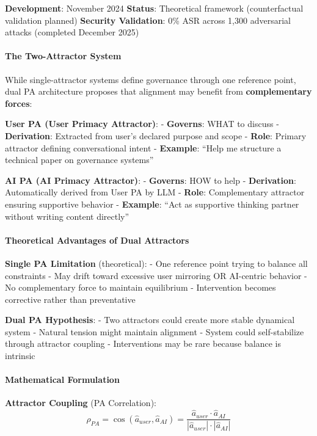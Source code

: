 \textbf{Development}: November 2024 \textbf{Status}: Theoretical
framework (counterfactual validation planned) \textbf{Security
Validation}: 0\% ASR across 1,300 adversarial attacks (completed
December 2025)

\paragraph{The Two-Attractor System}\label{the-two-attractor-system}

While single-attractor systems define governance through one reference
point, dual PA architecture proposes that alignment may benefit from
\textbf{complementary forces}:

\textbf{User PA (User Primacy Attractor)}: - \textbf{Governs}: WHAT to
discuss - \textbf{Derivation}: Extracted from user's declared purpose
and scope - \textbf{Role}: Primary attractor defining conversational
intent - \textbf{Example}: ``Help me structure a technical paper on
governance systems''

\textbf{AI PA (AI Primacy Attractor)}: - \textbf{Governs}: HOW to help -
\textbf{Derivation}: Automatically derived from User PA by LLM -
\textbf{Role}: Complementary attractor ensuring supportive behavior -
\textbf{Example}: ``Act as supportive thinking partner without writing
content directly''

\paragraph{Theoretical Advantages of Dual
Attractors}\label{theoretical-advantages-of-dual-attractors}

\textbf{Single PA Limitation} (theoretical): - One reference point
trying to balance all constraints - May drift toward excessive user
mirroring OR AI-centric behavior - No complementary force to maintain
equilibrium - Intervention becomes corrective rather than preventative

\textbf{Dual PA Hypothesis}: - Two attractors could create more stable
dynamical system - Natural tension might maintain alignment - System
could self-stabilize through attractor coupling - Interventions may be
rare because balance is intrinsic

\paragraph{Mathematical Formulation}\label{mathematical-formulation}

\textbf{Attractor Coupling} (PA Correlation):
\[\rho_{PA} = \cos(\hat{a}_{user}, \hat{a}_{AI}) = \frac{\hat{a}_{user} \cdot \hat{a}_{AI}}{|\hat{a}_{user}| \cdot |\hat{a}_{AI}|}\]

